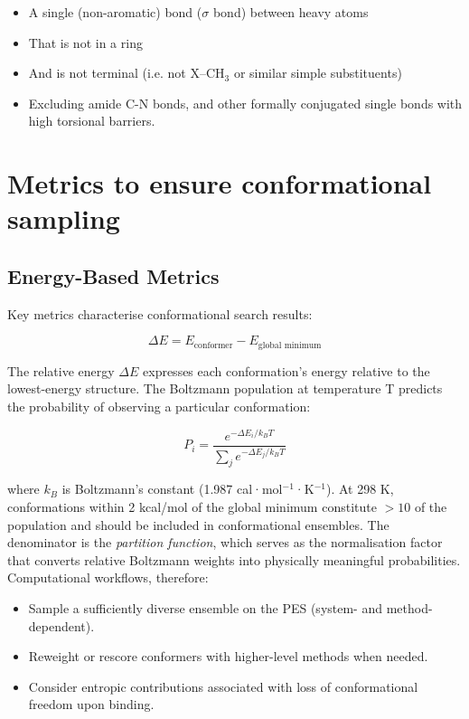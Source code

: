 \documentclass[12pt]{article}
\begin{document}
\begin{itemize}
\item A single (non-aromatic) bond ($\sigma$ bond) between heavy atoms
\item That is not in a ring
\item And is not terminal (i.e. not X–CH$_3$ or similar simple substituents)
\item Excluding amide C-N bonds, and other formally conjugated single bonds with high torsional barriers.
\end{itemize}


\section{Metrics to ensure conformational sampling}

\subsection{Energy-Based Metrics}

Key metrics characterise conformational search results:

\begin{equation}
    \Delta E = E_{\text{conformer}} - E_{\text{global minimum}}
\label{eq:relative_energy}
\end{equation}

The relative energy $\Delta E$ expresses each conformation’s energy relative to the lowest-energy structure. The Boltzmann population at temperature T predicts the probability of observing a particular conformation:

\begin{equation}
    P_i = \frac{e^{-\Delta E_i / k_B T}}{\sum_j e^{-\Delta E_j / k_B T}}
\label{eq:boltzmann}
\end{equation}

where $k_B$ is Boltzmann’s constant (1.987 cal·mol$^{-1}$·K$^{-1}$). At 298 K, conformations within 2 kcal/mol of the global minimum constitute $>10$ of the population and should be included in conformational ensembles.  The denominator is the \emph{partition function}, which serves as the normalisation factor that converts relative Boltzmann weights into physically meaningful probabilities.
Computational workflows, therefore:

\begin{itemize}
\item Sample a sufficiently diverse ensemble on the PES (system- and method-dependent).
\item Reweight or rescore conformers with higher-level methods when needed.
\item Consider entropic contributions associated with loss of conformational freedom upon binding.
\end{itemize}
\end{document}
